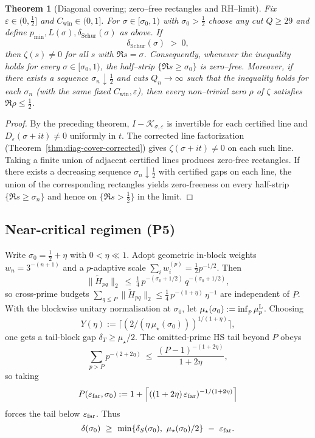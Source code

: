 \documentclass[11pt]{article}
\newtheorem{theorem}{Theorem}
\theoremstyle{definition}
\theoremstyle{remark}
\begin{document}
\begin{theorem}[Diagonal covering; zero--free rectangles and RH--limit]\label{thm:covering}
Fix $\varepsilon\in(0,\tfrac12]$ and $C_{\mathrm{win}}\in(0,1]$. For $\sigma\in[\sigma_{0},1)$ with $\sigma_{0}>\tfrac12$ choose any cut $Q\ge29$ and define $p_{\min},L(\sigma),\delta_{\mathrm{Schur}}(\sigma)$ as above. If
\[
  \delta_{\mathrm{Schur}}(\sigma)\;>\; 0,
\]
then $\zeta(s)\neq 0$ for all $s$ with $\Re s=\sigma$. Consequently, whenever the inequality holds for every $\sigma\in[\sigma_{0},1)$, the half--strip $\{\Re s\ge\sigma_{0}\}$ is zero--free. Moreover, if there exists a sequence $\sigma_{n}\downarrow\tfrac12$ and cuts $Q_{n}\to\infty$ such that the inequality holds for each $\sigma_{n}$ (with the same fixed $C_{\mathrm{win}},\varepsilon$), then every non--trivial zero $\rho$ of $\zeta$ satisfies $\Re\rho\le\tfrac12$.
\end{theorem}

\begin{proof}
By the preceding theorem, $I-\mathcal K_{\sigma,\varepsilon}$ is invertible for each certified line and $D_{\varepsilon}(\sigma+it)\ne 0$ uniformly in $t$. The corrected line factorization (Theorem~\ref{thm:diag-cover-corrected}) gives $\zeta(\sigma+it)\ne 0$ on each such line. Taking a finite union of adjacent certified lines produces zero-free rectangles. If there exists a decreasing sequence $\sigma_n\downarrow\tfrac12$ with certified gaps on each line, the union of the corresponding rectangles yields zero-freeness on every half-strip $\{\Re s\ge \sigma_n\}$ and hence on $\{\Re s>\tfrac12\}$ in the limit.
\end{proof}
\subsection*{Near-critical regimen (P5)}
Write $\sigma_0=\tfrac12+\eta$ with $0<\eta\ll1$. Adopt geometric in-block weights $w_n=3^{-(n+1)}$ and a $p$-adaptive scale $\sum_i w_i^{(p)}=\tfrac12 p^{-1/2}$. Then
\[ \|\widetilde H_{pq}\|_2\ \le\ \tfrac14\,p^{-(\sigma_0+1/2)}\,q^{-(\sigma_0+1/2)}, \]
so cross-prime budgets $\sum_{q\le P}\|\widetilde H_{pq}\|_2\le \tfrac14\,p^{-(1+\eta)}\,\eta^{-1}$ are independent of $P$. With the blockwise unitary normalisation at $\sigma_0$, let $\mu_\star(\sigma_0):=\inf_p\mu_p^{\rm L}$. Choosing
\[ Y(\eta):=\Big\lceil(2/(\eta\,\mu_\star(\sigma_0)))^{1/(1+\eta)}\Big\rceil, \]
one gets a tail-block gap $\delta_T\ge \mu_\star/2$. The omitted-prime HS tail beyond $P$ obeys
\[ \sum_{p>P} p^{-(2+2\eta)}\ \le\ \frac{(P-1)^{-(1+2\eta)}}{1+2\eta}, \]
so taking
\[ P(\varepsilon_{\rm far},\sigma_0):=1+\Big\lceil ((1+2\eta)\,\varepsilon_{\rm far})^{-1/(1+2\eta)}\Big\rceil \]
forces the tail below $\varepsilon_{\rm far}$. Thus
\[ \delta(\sigma_0)\ \ge\ \min\{\delta_S(\sigma_0),\ \mu_\star(\sigma_0)/2\}\ -\ \varepsilon_{\rm far}. \]
\end{document}
